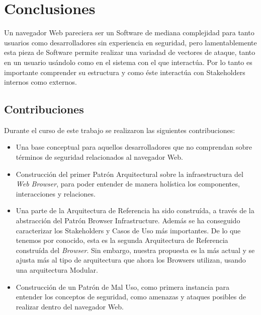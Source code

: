\chapter{Conclusiones}
\label{chap7:concl}

Un navegador Web pareciera ser un Software de mediana complejidad para tanto usuarios como desarrolladores sin experiencia en seguridad, pero lamentablemente esta pieza de Software permite realizar una variadad de vectores de ataque, tanto en un usuario usándolo como en el sistema con el que interactúa. Por lo tanto es importante comprender su estructura y como éste interactúa con Stakeholders internos como externos.


\section{Contribuciones}
Durante el curso de este trabajo se realizaron las siguientes contribuciones:
\begin{itemize}
	\item Una base conceptual para aquellos desarrolladores que no comprendan sobre términos de seguridad relacionados al navegador Web.
	\item Construcción del primer Patrón Arquitectural sobre la infraestructura del \textit{Web Browser}, para poder entender de manera holística los componentes, interacciones y relaciones.
	\item Una parte de la Arquitectura de Referencia ha sido construída, a través de la abstracción del Patrón Browser Infrastructure. Además se ha conseguido caracterizar los Stakeholders y Casos de Uso más importantes. De lo que tenemos por conocido, esta es la segunda Arquitectura de Referencia construída del \textit{Browser}. Sin embargo, nuestra propuesta es la más actual y se ajusta más al tipo de arquitectura que ahora los Browsers utilizan, usando una arquitectura Modular.
	\item Construcción de un Patrón de Mal Uso, como primera instancia para entender los conceptos de seguridad, como amenazas y ataques posibles de realizar dentro del navegador Web.
\end{itemize}

